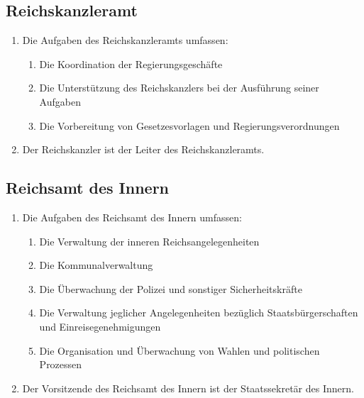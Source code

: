 \documentclass{article}
\begin{document}
\subsection{Reichskanzleramt}
\begin{enumerate}[(1)]
    \item Die Aufgaben des Reichskanzleramts umfassen:
    \begin{enumerate}[1.]
        \item Die Koordination der Regierungsgeschäfte
        \item Die Unterstützung des Reichskanzlers bei der Ausführung seiner Aufgaben
        \item Die Vorbereitung von Gesetzesvorlagen und Regierungsverordnungen
    \end{enumerate}
    \item Der Reichskanzler ist der Leiter des Reichskanzleramts.
\end{enumerate}

\subsection{Reichsamt des Innern}
\begin{enumerate}[(1)]
    \item Die Aufgaben des Reichsamt des Innern umfassen:
    \begin{enumerate}[1.]
        \item Die Verwaltung der inneren Reichsangelegenheiten
        \item Die Kommunalverwaltung
        \item Die Überwachung der Polizei und sonstiger Sicherheitskräfte
        \item Die Verwaltung jeglicher Angelegenheiten bezüglich Staatsbürgerschaften und Einreisegenehmigungen
        \item Die Organisation und Überwachung von Wahlen und politischen Prozessen
    \end{enumerate}
    \item Der Vorsitzende des Reichsamt des Innern ist der Staatssekretär des Innern.
\end{enumerate}
\end{document}

